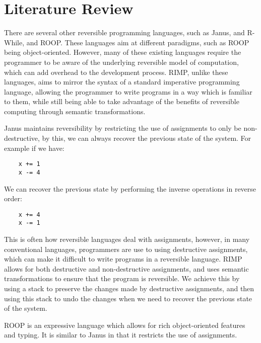 \chapter*{Literature Review}

There are several other reversible programming languages, such as Janus, and R-While, and ROOP\@.
These languages aim at different paradigms, such as ROOP being object-oriented.
However, many of these existing languages require the programmer to be aware of the underlying reversible model of computation, which can add overhead to the development process.
RIMP, unlike these languages, aims to mirror the syntax of a standard imperative programming language, allowing the programmer to write programs in a way which is familiar to them, while still being able to take advantage of the benefits of reversible computing through semantic transformations.

Janus maintains reversibility by restricting the use of assignments to only be non-destructive, by this, we can always recover the previous state of the system.
For example if we have:
\begin{lstlisting}
    x += 1
    x -= 4
\end{lstlisting}
We can recover the previous state by performing the inverse operations in reverse order:
\begin{lstlisting}
    x += 4
    x -= 1
\end{lstlisting}
This is often how reversible languages deal with assignments, however, in many conventional languages, programmers are use to using destructive assignments, which can make it difficult to write programs in a reversible language.
RIMP allows for both destructive and non-destructive assignments, and uses semantic transformations to ensure that the program is reversible.
We achieve this by using a stack to preserve the changes made by destructive assignments, and then using this stack to undo the changes when we need to recover the previous state of the system.

ROOP is an expressive language which allows for rich object-oriented features and typing.
It is similar to Janus in that it restricts the use of assignments.
